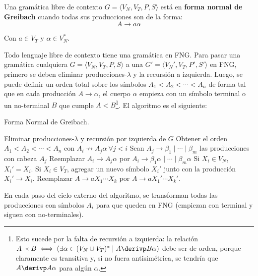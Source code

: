 Una gramática libre de contexto $G = \langle V_N, V_T, P, S \rangle$ está en \textbf{forma normal de Greibach} cuando todas sus producciones son de la forma:
$$
    A \to a \alpha
$$

Con $a \in V_T$ y $\alpha \in V_N^*$.

Todo lenguaje libre de contexto tiene una gramática en FNG. Para pasar una gramática cualquiera $G = \langle V_N, V_T, P, S \rangle$ a una $G' = \langle V_N', V_T, P', S' \rangle$ en FNG, primero se deben eliminar producciones-$\lambda$ y la recursión a izquierda. Luego, se puede definir un orden total sobre los símbolos $A_1 < A_2 < \cdots < A_n$ de forma tal que en cada producción $A \to \alpha$, el cuerpo $\alpha$ empieza con un símbolo terminal o un no-terminal $B$ que cumple $A < B$\footnote{Esto sucede por la falta de recursión a izquierda: la relación $A \prec B \iff (\exists \alpha \in (V_N \cup V_T)^* \mid A \derivp B \alpha)$ debe ser de orden, porque claramente es transitiva y, si no fuera antisimétrica, se tendría que $A \derivp A \alpha$ para algún $\alpha$.}. El algoritmo es el siguiente:

\begin{algorithm}[H]
    \caption{Forma Normal de Greibach.}
    \label{forma-normal-de-greibach}
    \begin{algorithmic}[1]
        \State Eliminar producciones-$\lambda$ y recursión por izquierda de $G$
        \State Obtener el orden $A_1 < A_2 < \cdots < A_n$ con $A_i \not\to A_j \alpha\ \forall j < i$
                \State Sean $A_j \to \beta_1 \mid \cdots \mid \beta_m$ las producciones con cabeza $A_j$
                \State Reemplazar $A_i \to A_j \alpha$ por $A_i \to \beta_1 \alpha \mid \cdots \mid \beta_m \alpha$
            \EndFor
             
                    \State Si $X_i \in V_N$, $X_i' = X_i$.
                    \State Si $X_i \in V_T$, agregar un nuevo símbolo $X_i'$ junto con la producción $X_i' \to X_i$.
                \EndFor
                \State Reemplazar $A \to a X_1 \cdots X_k$ por $A \to a X_1' \cdots X_k'$.
            \EndFor
        \EndFor
        \EndProcedure
    \end{algorithmic}
\end{algorithm}

En cada paso del ciclo externo del algoritmo, se transforman todas las producciones con símbolos $A_i$ para que queden en FNG (empiezan con terminal y siguen con no-terminales).

